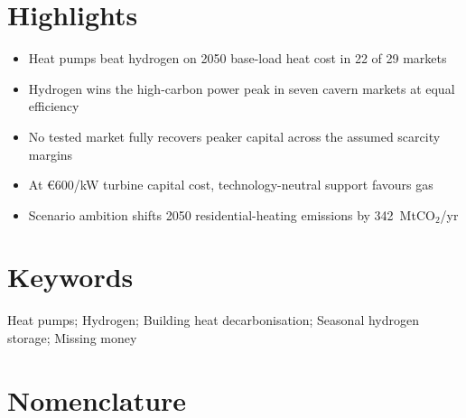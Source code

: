 \section*{Highlights}

\begin{itemize}
\item Heat pumps beat hydrogen on 2050 base-load heat cost in 22 of 29 markets
\item Hydrogen wins the high-carbon power peak in seven cavern markets at equal efficiency
\item No tested market fully recovers peaker capital across the assumed scarcity margins
\item At \euro{}600/kW turbine capital cost, technology-neutral support favours gas
\item Scenario ambition shifts 2050 residential-heating emissions by 342~MtCO$_2$/yr
\end{itemize}

\section*{Keywords}

Heat pumps; Hydrogen; Building heat decarbonisation; Seasonal hydrogen storage; Missing money

\section*{Nomenclature}

